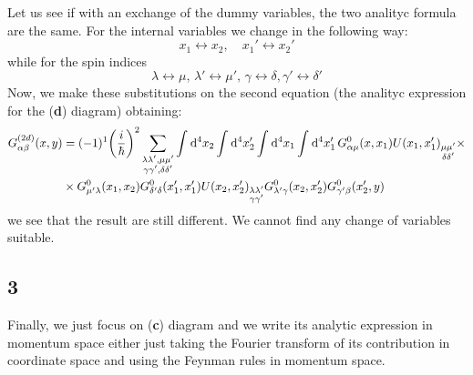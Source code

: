 \documentclass[11pt, a4paper, twoside, openright]{article}
\begin{document}
Let us see if with an exchange of the dummy variables, the two analityc formula are the same. For the internal variables we change in the following way:
\begin{equation*}
  x_1 \leftrightarrow  x_2, \quad  x_1' \leftrightarrow x_2'
\end{equation*}
while for the spin indices
\begin{equation*}
  \lambda  \leftrightarrow  \mu , \, \lambda' \leftrightarrow \mu', \,
  \gamma \leftrightarrow \delta, \gamma' \leftrightarrow \delta'
\end{equation*}
Now, we make these substitutions on the second equation (the analityc expression for the (\textbf{d}) diagram) obtaining:
\begin{equation*}
\begin{split}
  G_{\alpha \beta }^{(2d)} (x,y) &= (-1)^1 \qty(\frac{i}{\hbar })^2
   \sum_{\substack{\lambda \lambda', \mu \mu' \\ \gamma \gamma', \delta \delta'   } }^{} \int_{}^{} \dd[4]{x_2} \int_{}^{} \dd[4]{x_2'} \int_{}^{} \dd[4]{x_1} \int_{}^{} \dd[4]{x_1'}
   G_{\alpha \mu }^0 (x,x_1) U(x_1,x_1')_{\substack{ \mu \mu' \\ \delta \delta'} } \times \\
  & \times G^0_{\mu' \lambda } (x_1,x_2) G^0_{\delta' \delta } (x_1',x_1')
  U(x_2,x_2')_{\substack{ \lambda \lambda' \\ \gamma \gamma'} }
  G^0_{\lambda' \gamma } (x_2,x_2') G^0_{\gamma' \beta } (x_2',y)
\end{split}
\end{equation*}
we see that the result are still different. We cannot find any change of variables suitable.





\subsection*{3}
Finally, we just focus on (\textbf{c}) diagram and we write its analytic expression in momentum space either just taking the Fourier transform of its contribution in coordinate space and using the Feynman rules in momentum space.
\end{document}
